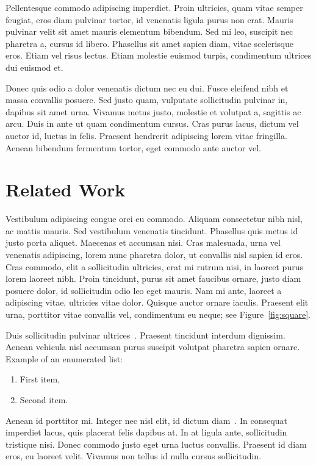 \documentclass[submission]{gmp2015}
\begin{document}
Pellentesque commodo adipiscing imperdiet. Proin ultricies, quam vitae semper feugiat, eros diam pulvinar tortor, id venenatis ligula purus non erat. Mauris pulvinar velit sit amet mauris elementum bibendum. Sed mi leo, suscipit nec pharetra a, cursus id libero. Phasellus sit amet sapien diam, vitae scelerisque eros. Etiam vel risus lectus. Etiam molestie euismod turpis, condimentum ultrices dui euismod et.

Donec quis odio a dolor venenatis dictum nec eu dui. Fusce eleifend nibh et massa convallis posuere. Sed justo quam, vulputate sollicitudin pulvinar in, dapibus sit amet urna. Vivamus metus justo, molestie et volutpat a, sagittis ac arcu. Duis in ante ut quam condimentum cursus. Cras purus lacus, dictum vel auctor id, luctus in felis. Praesent hendrerit adipiscing lorem vitae fringilla. Aenean bibendum fermentum tortor, eget commodo ante auctor vel.


\section{Related Work}\label{sec:relatedwork}

Vestibulum adipiscing congue orci eu commodo. Aliquam consectetur nibh nisl, ac mattis mauris. Sed vestibulum venenatis tincidunt. Phasellus quis metus id justo porta aliquet. Maecenas et accumsan nisi. Cras malesuada, urna vel venenatis adipiscing, lorem nunc pharetra dolor, ut convallis nisl sapien id eros. Cras commodo, elit a sollicitudin ultricies, erat mi rutrum nisi, in laoreet purus lorem laoreet nibh. Proin tincidunt, purus sit amet faucibus ornare, justo diam posuere dolor, id sollicitudin odio leo eget mauris. Nam mi ante, laoreet a adipiscing vitae, ultricies vitae dolor. Quisque auctor ornare iaculis. Praesent elit urna, porttitor vitae convallis vel, condimentum eu neque; see Figure~\ref{fig:square}.

Duis sollicitudin pulvinar ultrices~\cite{Peters:1997:BBC}. Praesent tincidunt interdum dignissim. Aenean vehicula nisl accumsan purus suscipit volutpat pharetra sapien ornare.
%
Example of an enumerated list:
\begin{enumerate}
  \item First item,
  \item Second item.
\end{enumerate}

Aenean id porttitor mi. Integer nec nisl elit, id dictum diam~\cite{Kazhdan:2008:SMF}. In consequat imperdiet lacus, quis placerat felis dapibus at. In at ligula ante, sollicitudin tristique nisi. Donec commodo justo eget urna luctus convallis. Praesent id diam eros, eu laoreet velit. Vivamus non tellus id nulla cursus sollicitudin.
\end{document}
